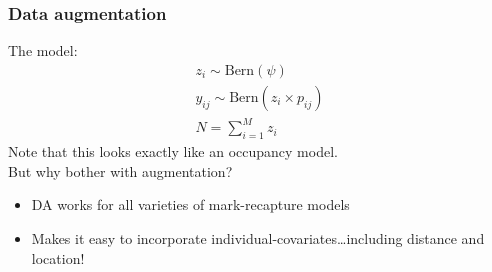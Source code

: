 \documentclass[color=usenames,dvipsnames]{beamer}\usepackage[]{graphicx}\usepackage[]{color}
\begin{document}
\begin{frame}
  \frametitle{Data augmentation}
  The model:
  \begin{gather*}
    z_i \sim \mathrm{Bern}(\psi) \\
    y_{ij} \sim \mathrm{Bern}(z_i \times p_{ij}) \\
    N=\sum_{i=1}^M z_i
  \end{gather*}
  \pause \vfill
  Note that this looks exactly like an occupancy model. \\
  \pause \vfill
  But why bother with augmentation?
  \begin{itemize}
    \item DA works for \alert{all} varieties of mark-recapture models
    \item Makes it easy to incorporate
      individual-covariates\dots\pause including distance and
      location!   
  \end{itemize}
\end{frame}




\end{document}
